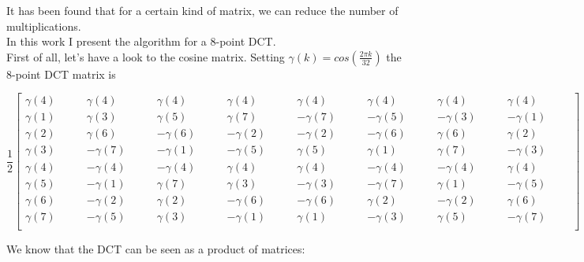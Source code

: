      It has been found that for a certain kind of matrix, we can reduce the number of multiplications.\\
     In this work I present the algorithm for a 8-point DCT.\\
     First of all, let's have a look to the cosine matrix.
     Setting $ \gamma(k)=cos(\frac{2\pi k}{32}) $ the 8-point DCT matrix is
     \bigskip
     
     \begin{center}	
     	$ \dfrac{1}{2}\begin{bmatrix} \gamma(4)  & \gamma(4) &\gamma(4)  & \gamma(4) &\gamma(4)  & \gamma(4) &\gamma(4)  & \gamma(4) \\
     	
     	\gamma(1)  & \gamma(3) &\gamma(5)  & \gamma(7) &-\gamma(7)\qquad  & -\gamma(5)\qquad &-\gamma(3) \qquad & -\gamma(1) \qquad      	\\
     	
    \gamma(2)  & \gamma(6) &-\gamma(6) \qquad & -\gamma(2) \qquad&-\gamma(2)  & -\gamma(6) &\gamma(6)  & \gamma(2)\\ 

\gamma(3)  & -\gamma(7) &-\gamma(1)  & -\gamma(5) &\gamma(5)  & \gamma(1) &\gamma(7)  & -\gamma(3)\\
 
\gamma(4)  & -\gamma(4) &-\gamma(4)  & \gamma(4) &\gamma(4)  & -\gamma(4) &-\gamma(4)  & \gamma(4)\\

\gamma(5)  & -\gamma(1) &\gamma(7)  & \gamma(3) &-\gamma(3)  & -\gamma(7) &\gamma(1)  & -\gamma(5)\\
     
\gamma(6)  & -\gamma(2) &\gamma(2)  & -\gamma(6) &-\gamma(6)  & \gamma(2) &-\gamma(2)  & \gamma(6)\\

\gamma(7) \qquad & -\gamma(5) \qquad&\gamma(3)  & -\gamma(1) &\gamma(1)  & -\gamma(3) &\gamma(5)  & -\gamma(7)\\   
      \end{bmatrix} $
     	
     \end{center}
     \bigskip
     We know that the DCT can be seen as a product of matrices:
     

